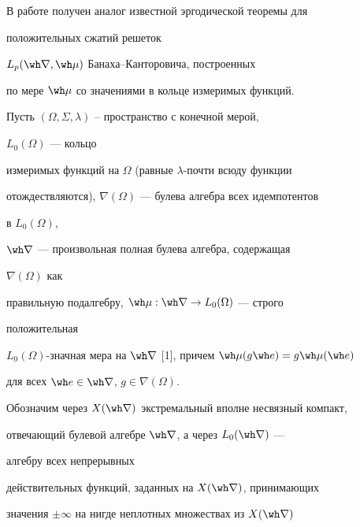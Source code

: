  




\maketitle 


\label{begin} 


 


В работе получен аналог известной эргодической теоремы для 


положительных сжатий решеток 


$L_p(\wh\nabla,\wh\mu)$ Банаха--Канторовича, построенных 


по мере $\wh\mu$ со значениями в кольце измеримых функций. 


 


Пусть $(\Omega,\Sigma,\lambda)$ -- пространство с конечной мерой, 


$L_0(\Omega)$ --- кольцо 


измеримых функций на $\Omega$ (равные $\lambda$-почти всюду функции 


отождествляются), $\nabla(\Omega)$ --- булева алгебра всех идемпотентов 


в $L_0(\Omega)$, 


$\wh\nabla$ --- произвольная полная булева алгебра, содержащая 


$\nabla(\Omega)$ как 


правильную подалгебру, $\wh\mu:\wh\nabla\to L_0(\Omega)$ --- строго 


положительная 


$L_0(\Omega)$-значная мера на $\wh\nabla$ [1], причем $\wh\mu(g\wh 


e)=g\wh\mu(\wh e)$ 


для всех $\wh e\in\wh\nabla$, $g\in\nabla(\Omega)$. 


 


Обозначим через $X(\wh\nabla)$ экстремальный вполне несвязный компакт, 


отвечающий булевой алгебре $\wh\nabla$, а через $L_0(\wh\nabla)$ --- 


алгебру всех непрерывных 


действительных функций, заданных на $X(\wh\nabla)$, принимающих 


значения $\pm\infty$ на нигде неплотных множествах из $X(\wh\nabla)$ 


